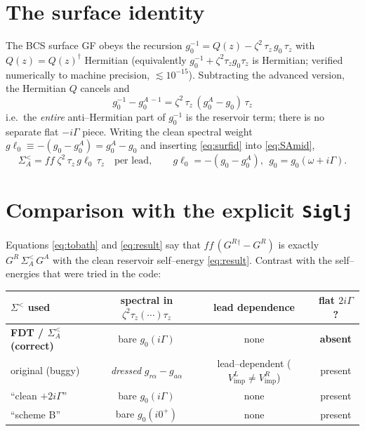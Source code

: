 \documentclass[11pt]{article}
\newcommand{\GR}{G^{R}}
\newcommand{\GA}{G^{A}}
\newcommand{\gz}{g_{0}}
\newcommand{\tz}{\tau_{z}}
\newcommand{\Vimp}{V_{\mathrm{imp}}}
\newcommand{\Sless}{\Sigma^{<}}
\newcommand{\dg}{^{\dagger}}
\begin{document}
\section{The surface identity}

The BCS surface GF obeys the recursion $\gz^{-1}=Q(z)-\zeta^{2}\,\tz\,\gz\,\tz$ with
$Q(z)=Q(z)\dg$ Hermitian (equivalently $\gz^{-1}+\zeta^2\tz\gz\tz$ is Hermitian;
verified numerically to machine precision, $\lesssim10^{-15}$). Subtracting the
advanced version, the Hermitian $Q$ cancels and
\begin{equation}
  \boxed{\;\gz^{-1}-\gz^{A\,-1}
  =\zeta^{2}\,\tz\,(\gz^{A}-\gz)\,\tz\;}
  \label{eq:surfid}
\end{equation}
i.e.\ the \emph{entire} anti--Hermitian part of $\gz^{-1}$ is the reservoir term;
there is no separate flat $-i\Gamma$ piece. Writing the clean spectral weight
$g\ell_{0}\equiv-(\gz-\gz^{A})=\gz^{A}-\gz$ and inserting \eqref{eq:surfid} into
\eqref{eq:SAmid},
\begin{equation}
  \boxed{\;\Sless_{A}=ff\;\zeta^{2}\,\tz\,g\ell_{0}\,\tz\quad\text{per lead},
  \qquad g\ell_{0}=-(\gz-\gz^{A}),\ \ \gz=\gz(\omega+i\Gamma).\;}
  \label{eq:result}
\end{equation}

\section{Comparison with the explicit \texttt{Siglj}}

Equations \eqref{eq:tobath} and \eqref{eq:result} say that
$ff\,(\GR{}\dg-\GR)$ is exactly $\GR\,\Sless_{A}\,\GA$ with the clean reservoir
self--energy \eqref{eq:result}. Contrast with the self--energies that were tried in
the code:

\begin{center}
\renewcommand{\arraystretch}{1.3}
\begin{tabular}{lccc}
\toprule
$\Sless$ used & spectral in $\zeta^2\tz(\cdots)\tz$ & lead dependence & flat $2i\Gamma$?\\
\midrule
\textbf{FDT / $\Sless_{A}$ (correct)} & bare $\gz(i\Gamma)$ & none & \textbf{absent}\\
original (buggy) & \emph{dressed} $g_{r\alpha}-g_{a\alpha}$ & lead--dependent ($\Vimp^{L}\!\neq\!\Vimp^{R}$) & present\\
``clean $+2i\Gamma$'' & bare $\gz(i\Gamma)$ & none & present\\
``scheme B'' & bare $\gz(i0^{+})$ & none & present\\
\bottomrule
\end{tabular}
\end{center}
\end{document}
